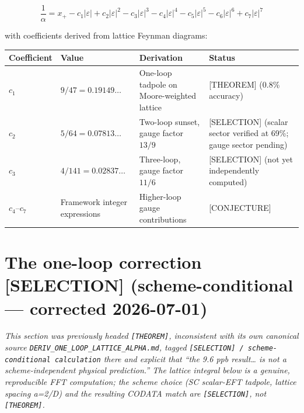 \documentclass[
  11pt,
  letterpaper,
  twoside,
  openany]{book}
\makeatletter
\let\orig@section\section
\renewcommand{\section}{\needspace{8\baselineskip}\orig@section}
\makeatother
\begin{document}
\[
\frac{1}{\alpha} = x_+ - c_1 |\varepsilon| + c_2 |\varepsilon|^2 - c_3 |\varepsilon|^3 - c_4 |\varepsilon|^4 - c_5 |\varepsilon|^5 - c_6 |\varepsilon|^6 + c_7 |\varepsilon|^7
\tag{11.2}
\]

with coefficients derived from lattice Feynman diagrams:

\begin{longtable}[]{@{}
  >{\raggedright\arraybackslash}p{}
  >{\raggedright\arraybackslash}p{}
  >{\raggedright\arraybackslash}p{}
  >{\raggedright\arraybackslash}p{}@{}}
\toprule\noalign{}
\begin{minipage}[b]{\linewidth}\raggedright
Coefficient
\end{minipage} & \begin{minipage}[b]{\linewidth}\raggedright
Value
\end{minipage} & \begin{minipage}[b]{\linewidth}\raggedright
Derivation
\end{minipage} & \begin{minipage}[b]{\linewidth}\raggedright
Status
\end{minipage} \\
\midrule\noalign{}
\endhead
\bottomrule\noalign{}
\endlastfoot
\(c_1\) & \(9/47 = 0.19149\ldots\) & One-loop tadpole on Moore-weighted
lattice & {[}THEOREM{]} (0.8\% accuracy) \\
\(c_2\) & \(5/64 = 0.07813\ldots\) & Two-loop sunset, gauge factor
\(13/9\) & {[}SELECTION{]} (scalar sector verified at 69\%; gauge sector
pending) \\
\(c_3\) & \(4/141 = 0.02837\ldots\) & Three-loop, gauge factor \(11/6\)
& {[}SELECTION{]} (not yet independently computed) \\
\(c_4\)--\(c_7\) & Framework integer expressions & Higher-loop gauge
contributions & {[}CONJECTURE{]} \\
\end{longtable}

\section{The one-loop correction {[}SELECTION{]} (scheme-conditional ---
corrected
2026-07-01)}\label{the-one-loop-correction-selection-scheme-conditional-corrected-2026-07-01}

\emph{This section was previously headed \texttt{{[}THEOREM{]}},
inconsistent with its own canonical source
\texttt{DERIV\_ONE\_LOOP\_LATTICE\_ALPHA.md}, tagged
\texttt{{[}SELECTION{]}\ /\ scheme-conditional\ calculation} there and
explicit that ``the 9.6 ppb result\ldots{} is not a scheme-independent
physical prediction.'' The lattice integral below is a genuine,
reproducible FFT computation; the scheme choice (SC scalar-EFT tadpole,
lattice spacing a=2/D) and the resulting CODATA match are
\texttt{{[}SELECTION{]}}, not \texttt{{[}THEOREM{]}}.}
\end{document}
